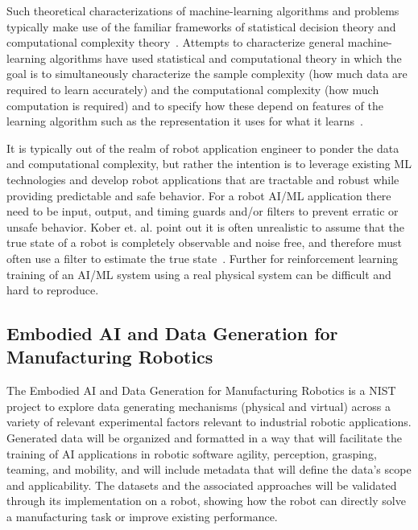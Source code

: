  Such theoretical characterizations of machine-learning algorithms and problems typically make use of the familiar frameworks of statistical decision theory and computational complexity theory~\cite{Jordan255}. Attempts to characterize general machine-learning algorithms  have used statistical and computational theory in which the goal is to simultaneously characterize the sample complexity (how much data are required to learn accurately) and the computational complexity (how much computation is required) and to specify how these depend on features of the learning algorithm such as the representation it uses for what it learns~\cite{valiant1984theory,chandrasekaran2013computational}.
 
 It is typically out of the realm of robot application engineer  to ponder the data and computational complexity, but rather the intention is to leverage existing ML technologies and develop robot applications that are tractable and robust while providing predictable and safe behavior.  For a robot AI/ML application there need to be input, output, and timing guards and/or filters to prevent erratic or unsafe behavior. Kober et. al. point out it is often unrealistic to assume that the true state of a robot is completely observable and noise free, and therefore must often use a filter to estimate the true state~\cite{kober2013reinforcement}. Further for reinforcement learning training of an AI/ML system using a real physical system can be difficult and hard to reproduce.


\subsection{Embodied AI and Data Generation for Manufacturing Robotics}
 The Embodied AI and Data Generation for Manufacturing Robotics is a NIST project to explore data generating mechanisms (physical and virtual) across a variety of relevant experimental factors relevant to industrial robotic applications. Generated data will be organized and formatted in a way that will facilitate the training of AI applications in robotic software agility, perception, grasping, teaming, and mobility, and will include metadata that will define the data’s scope and applicability. The datasets and the associated approaches will be validated through its implementation on a robot, showing how the robot can directly solve a manufacturing task or improve existing performance. 

